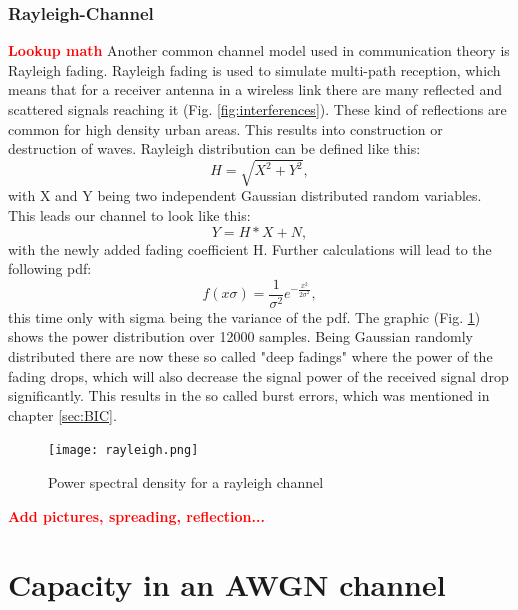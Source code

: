 \documentclass[12pt,oneside, reqno]{report}
\newcommand\boldred[1]{\textcolor{red}{\textbf{#1}}}
\begin{document}
\newpage
\subsection{Rayleigh-Channel}
\boldred{Lookup math}
\newline
Another common channel model used in communication theory is Rayleigh fading. Rayleigh fading is used to simulate multi-path reception, which means that for a receiver antenna in a wireless link there are many reflected and scattered signals reaching it (Fig. \ref{fig:interferences}). These kind of reflections are common for high density urban areas. This results into construction or destruction of waves. Rayleigh distribution can be defined like this: 
\newline
\begin{equation}
\label{eq:rayleigh}
 H = \sqrt{X^2 + Y^2},
\end{equation}
with X and Y being two independent Gaussian distributed random variables. This leads our channel to look like this:
\newline
\begin{equation}
\label{eq:rayleighchan}
Y = H * X + N,
\end{equation}
with the newly added fading coefficient H.
\newline
Further calculations will lead to the following pdf:
\begin{equation}
\label{eq:raypdf}
f(x\sigma) = \frac{1}{\sigma^2}e^{-\frac{x^2}{2\sigma^2}},
\end{equation}
this time only with sigma being the variance of the pdf. The graphic (Fig. \ref{fig:rayleigh}) shows the power distribution over 12000 samples. Being Gaussian randomly distributed there are now these so called "deep fadings" where the power of the fading drops, which will also decrease the signal power of the received signal drop significantly. This results in the so called burst errors, which was mentioned in chapter \ref{sec:BIC}.
\begin{figure}[H]
	\centering
	\texttt{[image: rayleigh.png]}
	\caption{Power spectral density for a rayleigh channel}
	\label{fig:rayleigh}
\end{figure}

\boldred{Add pictures, spreading, reflection...}
	
\newpage
\chapter{Capacity in an AWGN channel}
\end{document}
